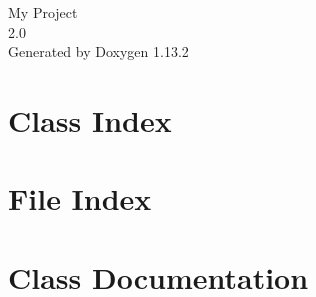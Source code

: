 \documentclass[twoside]{book}
\newcommand{\+}{\discretionary{\mbox{\scriptsize$\hookleftarrow$}}{}{}}
\newcommand{\clearemptydoublepage}{%
    \newpage{\pagestyle{empty}\cleardoublepage}%
  }
\begin{document}
  \raggedbottom
    \hypersetup{pageanchor=false,
                bookmarksnumbered=true,
                pdfencoding=unicode
               }
  \begin{titlepage}
  \vspace*{7cm}
  \begin{center}%
  {\Large My Project}\\
  [1ex]\large 2.\+0 \\
  \vspace*{1cm}
  {\large Generated by Doxygen 1.13.2}\\
  \end{center}
  \end{titlepage}
  \clearemptydoublepage
  \tableofcontents
  \clearemptydoublepage
  \hypersetup{pageanchor=true}

\chapter{Class Index}

\chapter{File Index}

\chapter{Class Documentation}


\end{document}
